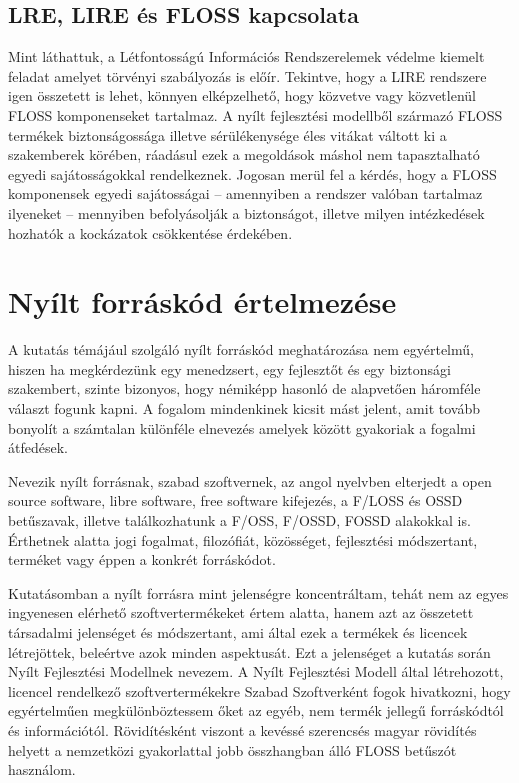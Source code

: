 \documentclass[12pt,magyar,a4paper,oneside]{scrreprt}
\begin{document}
\hypertarget{lre-lire-uxe9s-floss-kapcsolata}{%
\subsection{LRE, LIRE és FLOSS
kapcsolata}\label{lre-lire-uxe9s-floss-kapcsolata}}

Mint láthattuk, a Létfontosságú Információs Rendszerelemek védelme
kiemelt feladat amelyet törvényi szabályozás is előír. Tekintve, hogy a
LIRE rendszere igen összetett is lehet, könnyen elképzelhető, hogy
közvetve vagy közvetlenül FLOSS komponenseket tartalmaz. A nyílt
fejlesztési modellből származó FLOSS termékek biztonságossága illetve
sérülékenysége éles vitákat váltott ki a szakemberek körében, ráadásul
ezek a megoldások máshol nem tapasztalható egyedi sajátosságokkal
rendelkeznek. Jogosan merül fel a kérdés, hogy a FLOSS komponensek
egyedi sajátosságai -- amennyiben a rendszer valóban tartalmaz ilyeneket
-- mennyiben befolyásolják a biztonságot, illetve milyen intézkedések
hozhatók a kockázatok csökkentése érdekében.

\hypertarget{sec:WhatIsFLOSS}{%
\section{Nyílt forráskód értelmezése}\label{sec:WhatIsFLOSS}}

A kutatás témájául szolgáló nyílt forráskód meghatározása nem
egyértelmű, hiszen ha megkérdezünk egy menedzsert, egy fejlesztőt és egy
biztonsági szakembert, szinte bizonyos, hogy némiképp hasonló de
alapvetően háromféle választ fogunk kapni. A fogalom mindenkinek kicsit
mást jelent, amit tovább bonyolít a számtalan különféle elnevezés
amelyek között gyakoriak a fogalmi átfedések.

Nevezik nyílt forrásnak, szabad szoftvernek, az angol nyelvben elterjedt
a open source software, libre software, free software kifejezés, a
F/LOSS és OSSD betűszavak, illetve találkozhatunk a F/OSS, F/OSSD, FOSSD
alakokkal is. Érthetnek alatta jogi fogalmat, filozófiát, közösséget,
fejlesztési módszertant, terméket vagy éppen a konkrét forráskódot.

Kutatásomban a nyílt forrásra mint jelenségre koncentráltam, tehát nem
az egyes ingyenesen elérhető szoftvertermékeket értem alatta, hanem azt
az összetett társadalmi jelenséget és módszertant, ami által ezek a
termékek és licencek létrejöttek, beleértve azok minden aspektusát. Ezt
a jelenséget a kutatás során Nyílt Fejlesztési Modellnek nevezem. A
Nyílt Fejlesztési Modell által létrehozott, licencel rendelkező
szoftvertermékekre Szabad Szoftverként fogok hivatkozni, hogy
egyértelműen megkülönböztessem őket az egyéb, nem termék jellegű
forráskódtól és információtól. Rövidítésként viszont a kevéssé
szerencsés magyar rövidítés helyett a nemzetközi gyakorlattal jobb
összhangban álló FLOSS betűszót használom.
\end{document}
